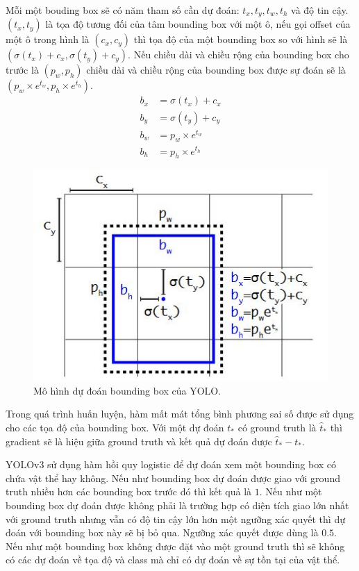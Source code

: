 Mỗi một bouding box sẽ có năm tham số cần dự đoán: $t_x,t_y,t_w,t_h$ và độ tin cậy. $(t_x,t_y)$ là tọa độ tương đối của tâm bounding box với một ô, nếu gọi offset của một ô trong hình là $(c_x,c_y)$ thì tọa độ của một bounding box so với hình sẽ là $(\sigma \left( t_x \right)+c_x,\sigma \left( t_y \right)+c_y)$. Nếu chiều dài và chiều rộng của bounding box cho trước là $\left( p_w,p_h \right)$ chiều dài và chiều rộng của bounding box được sự đoán sẽ là $\left( p_w \times e^{t_w},p_h \times e^{t_h} \right)$.
\begin{align*}
	b_x &= \sigma \left( t_x \right)+c_x\\
	b_y &= \sigma \left( t_y \right)+c_y\\
	b_w &= p_w \times e^{t_w}\\
	b_h &= p_h \times e^{t_h}
\end{align*}
\begin{figure}[ht!]
	\centerline{\includegraphics[scale=0.8]{images/bounding_box_prediction.jpg}}
  	\caption{Mô hình dự đoán bounding box của YOLO.}
  	\label{fig:bounding_box_prediction}
\end{figure}
Trong quá trình huấn luyện, hàm mất mát tổng bình phương sai số được sử dụng cho các tọa độ của bounding box. Với một dự đoán $t_*$ có ground truth là ${\widehat{t}}_*$ thì gradient sẽ là hiệu giữa ground truth và kết quả dự đoán được ${\widehat{t}}_* - t_*$.

YOLOv3\cite{redmon:2018:yolov3} sử dụng hàm hồi quy logistic để dự đoán xem một bounding box có chứa vật thể hay không. Nếu như bounding box dự đoán được giao với ground truth nhiều hơn các bounding box trước đó thì kết quả là $1$. Nếu như một bounding box dự đoán được không phải là trường hợp có diện tích giao lớn nhất với ground truth nhưng vẫn có độ tin cậy lớn hơn một ngưỡng xác quyết thì dự đoán với bounding box này sẽ bị bỏ qua. Ngưỡng xác quyết được dùng là $0.5$. Nếu như một bounding box không được đặt vào một ground truth thì sẽ không có các dự đoán về tọa độ và class mà chỉ có dự đoán về sự tồn tại của vật thể.

